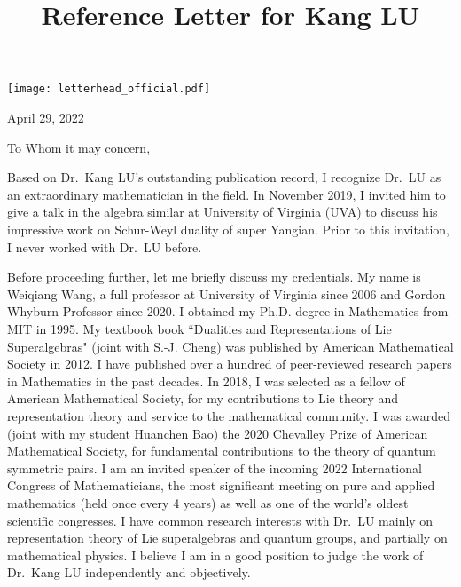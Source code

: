 \documentclass[12pt]{amsart} %
\begin{document}
\texttt{[image: letterhead\_official.pdf]}


\begin{flushright}
{April 29, 2022}
\end{flushright}
\title[]
{\small Reference Letter for Kang LU}


\maketitle



\vspace{.3cm}



\noindent To Whom it may concern, 
\vspace{2mm}

Based on Dr.\ Kang LU's outstanding publication record, I recognize Dr.\ LU as an extraordinary mathematician in the field. In November 2019, I invited him to give a talk in the algebra similar at University of Virginia (UVA) to discuss his impressive work on Schur-Weyl duality of super Yangian. Prior to this invitation, I never worked with Dr.\ LU before. 

Before proceeding further, let me briefly discuss my credentials. My name is Weiqiang Wang, a full professor at University of Virginia since 2006 and Gordon Whyburn Professor since 2020. I obtained my Ph.D. degree in Mathematics from MIT in 1995. My textbook book ``Dualities and Representations of Lie Superalgebras" (joint with S.-J. Cheng) was published by American Mathematical Society in 2012. I have published over a hundred of peer-reviewed research papers in Mathematics in the past decades. In 2018, I was selected as a fellow of American Mathematical Society, for my contributions to Lie theory and representation theory and service to the mathematical community. I was awarded (joint with my student Huanchen Bao) the 2020 Chevalley Prize of American Mathematical Society, for fundamental contributions to the theory of quantum symmetric pairs. I am an invited speaker of the incoming 2022 International Congress of Mathematicians, the most significant meeting on pure and applied mathematics (held once every 4 years) as well as one of the world's oldest scientific congresses. I have common research interests with Dr.\ LU mainly on representation theory of Lie superalgebras and quantum groups, and partially on mathematical physics.  I believe I am in a good position to judge the work of Dr.\ Kang LU independently and objectively. 
\end{document}
